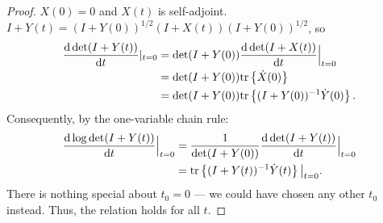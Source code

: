 \begin{proof}
  $X(0) = 0$ and $X(t)$ is self-adjoint.
  $I+Y(t) = (I+Y(0))^{1/2}(I+X(t))(I+Y(0))^{1/2}$, so
  \begin{align*}
    \frac{\text{\textup{d}} \det (I+Y(t))}{\text{\textup{d}} t}|_{t=0} 
    &= \det (I+Y(0))\frac{\text{\textup{d}} \det (I+X(t))}{\text{\textup{d}} t}\Big |_{t=0} \\
    &= \det (I+Y(0)) \textup{tr}\left \{\dot{X}(0) \right \} \\
    &= \det (I+Y(0)) \textup{tr}\left \{(I+Y(0))^{-1} \dot{Y}(0) \right \}.
  \end{align*}
  Consequently, by the one-variable chain rule:
  \begin{align*}
    \frac{\text{\textup{d}} \log \det (I+Y(t))}{\text{\textup{d}} t}\Big |_{t=0} &=
    \frac{1}{\det (I+Y(0))}\frac{\text{\textup{d}} \det (I+Y(t))}{\text{\textup{d}} t}\Big |_{t=0} \\ 
    &= \textup{tr}\left \{ (I+Y(t))^{-1} \dot{Y}(t) \right \} \big |_{t=0}.
  \end{align*}
  There is nothing special about $t_0 = 0$ --- we could have chosen
  any other $t_0$ instead. Thus, the relation holds for all $t$.
\end{proof}


